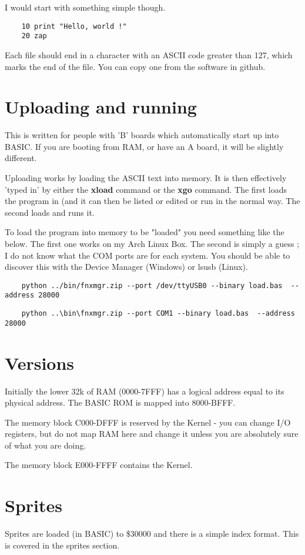 I would start with something simple though.

\begin{verbatim}
	10 print "Hello, world !"
	20 zap
\end{verbatim}

Each file should end in a character with an ASCII code greater than 127, which marks the end of the file.  You can copy one from the software in github.

\section{Uploading and running}

This is written for people with 'B' boards which automatically start up into BASIC. If you are booting from RAM, or have an A board, it will be slightly different.

Uploading works by loading the ASCII text into memory. It is then effectively 'typed in' by either the \textbf{xload} command or the \textbf{xgo} command. The first loads the program in (and it can then be listed or edited or run in the normal way. The second loads and runs it.

To load the program into memory to be "loaded" you need something like the below. The first one works on my Arch Linux Box. The second is simply a guess ; I do not know what the COM ports are for each system. You should be able to discover this with the Device Manager (Windows) or lsusb (Linux).

\begin{verbatim}
	python ../bin/fnxmgr.zip --port /dev/ttyUSB0 --binary load.bas  --address 28000
\end{verbatim}

\begin{verbatim}
	python ..\bin\fnxmgr.zip --port COM1 --binary load.bas  --address 28000
\end{verbatim}

\section{Versions}

Initially the lower 32k of RAM (0000-7FFF) has a logical address equal to its physical address. The BASIC ROM is mapped into 8000-BFFF. 

The memory block C000-DFFF is reserved by the Kernel - you can change I/O registers, but do not map RAM here and change it unless you are absolutely sure of what you are doing.

The memory block E000-FFFF contains the Kernel.

\section{Sprites}
Sprites are loaded (in BASIC) to \$30000 and there is a simple index format. This is covered in the sprites section.
